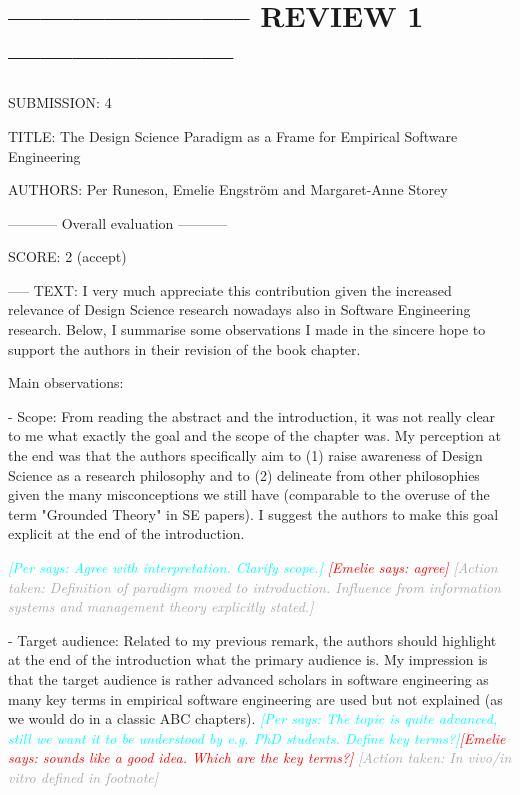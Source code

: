\documentclass{article}
\newcommand{\emelie}[1]{\textcolor{red}{{\it [Emelie says: #1]}}}
\newcommand{\per}[1]{\textcolor{cyan}{{\it [Per says: #1]}}}
\newcommand{\action}[1]{\textcolor{darkgray}{{\it [Action taken: #1]}}}
\newcommand{\emelie}[1]{}
\newcommand{\per}[1]{}
\newcommand{\action}[1]{}
\begin{document}
\section*{----------------------- REVIEW 1 ---------------------}

SUBMISSION: 4

TITLE: The Design Science Paradigm as a Frame for Empirical Software Engineering

AUTHORS: Per Runeson, Emelie Engström and Margaret-Anne Storey

----------- Overall evaluation -----------

SCORE: 2 (accept)

----- TEXT:
I very much appreciate this contribution given the increased relevance of Design Science research nowadays also in Software Engineering research. Below, I summarise some observations I made in the sincere hope to support the authors in their revision of the book chapter.

Main observations:

- Scope: From reading the abstract and the introduction, it was not really clear to me what exactly the goal and the scope of the chapter was. My perception at the end was that the authors specifically aim to (1) raise awareness of Design Science as a research philosophy and to (2) delineate from other philosophies given the many misconceptions we still have (comparable to the overuse of the term "Grounded Theory" in SE papers). I suggest the authors to make this goal explicit at the end of the introduction.

\per{Agree with interpretation. Clarify scope.}
\emelie{agree}
\action{Definition of paradigm moved to introduction. Influence from information systems and management theory explicitly stated.}

- Target audience: Related to my previous remark, the authors should highlight at the end of the introduction what the primary audience is. My impression is that the target audience is rather advanced scholars in software engineering as many key terms in empirical software engineering are used but not explained (as we would do in a classic ABC chapters).
\per{The topic is quite advanced, still we want it to be understood by e.g. PhD students. Define key terms?}\emelie{sounds like a good idea. Which are the key terms?} \action{In vivo/in vitro defined in footnote}
\end{document}
